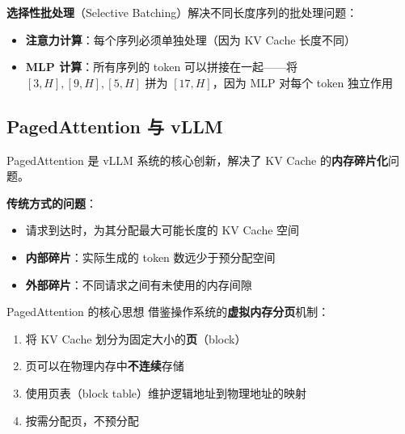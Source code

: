\textbf{选择性批处理}（Selective Batching）解决不同长度序列的批处理问题：

\begin{itemize}
    \item \textbf{注意力计算}：每个序列必须单独处理（因为 KV Cache 长度不同）
    \item \textbf{MLP 计算}：所有序列的 token 可以拼接在一起——将 $[3, H], [9, H], [5, H]$ 拼为 $[17, H]$，因为 MLP 对每个 token 独立作用
\end{itemize}

\subsection{PagedAttention 与 vLLM}

PagedAttention 是 vLLM 系统的核心创新，解决了 KV Cache 的\textbf{内存碎片化}问题。

\textbf{传统方式的问题}：

\begin{itemize}
    \item 请求到达时，为其分配最大可能长度的 KV Cache 空间
    \item \textbf{内部碎片}：实际生成的 token 数远少于预分配空间
    \item \textbf{外部碎片}：不同请求之间有未使用的内存间隙
\end{itemize}

\begin{importantbox}{PagedAttention 的核心思想}
借鉴操作系统的\textbf{虚拟内存分页}机制：
\begin{enumerate}
    \item 将 KV Cache 划分为固定大小的\textbf{页}（block）
    \item 页可以在物理内存中\textbf{不连续}存储
    \item 使用页表（block table）维护逻辑地址到物理地址的映射
    \item 按需分配页，不预分配
\end{enumerate}
\end{importantbox}

